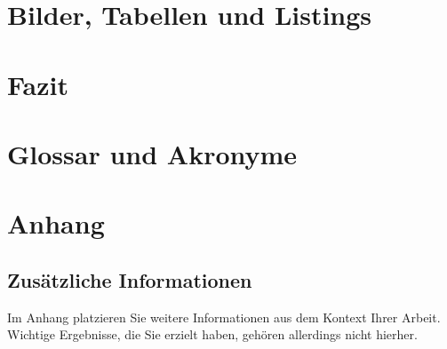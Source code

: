 \documentclass[
    12pt,
    a4paper,
    doubleside,
    BCOR=10mm,
    parskip=half,
    ngerman
]{scrbook}
\begin{document}
\chapter{Bilder, Tabellen und Listings}\label{sec:BilderTabellenListings}


\chapter{Fazit}\label{sec:summary}


\backmatter

\chapter{Glossar und Akronyme}\label{sec:glossary}


\singlespacing{}
\printnoidxglossary[type=\acronymtype,title={Abkürzungen\label{akronyme}}]
\printnoidxglossary[title={Glossar}]

\newpage
{}



\newpage
\chapter{Anhang}\label{appendix}
\section{Zusätzliche Informationen}\label{att:bigpicture}
Im Anhang platzieren Sie weitere Informationen aus dem Kontext Ihrer Arbeit.
Wichtige Ergebnisse, die Sie erzielt haben, gehören allerdings nicht hierher.
\end{document}
